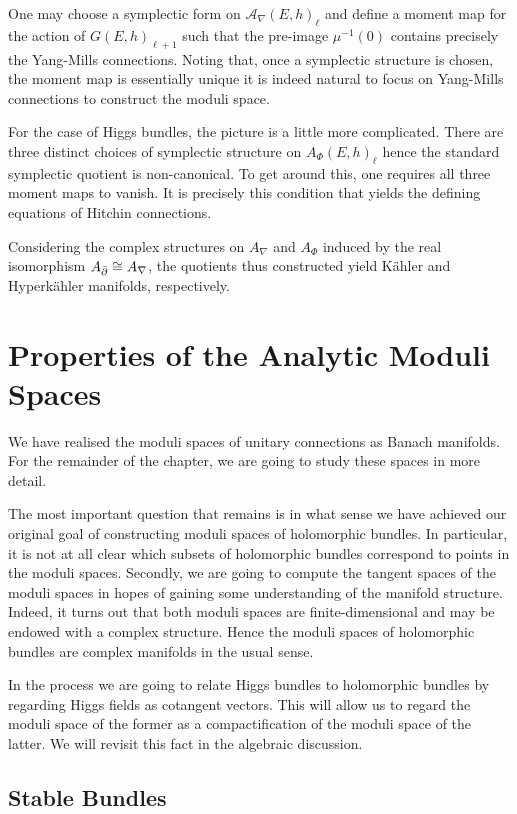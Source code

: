 \documentclass[12pt]{ociamthesis}  %
\begin{document}
One may choose a symplectic form on $\mathcal A_\nabla(E,h)_\ell$ and
define a moment map for the action of $G(E,h)_{\ell+1}$ such that the
pre-image $\mu^{-1}(0)$ contains precisely the Yang-Mills connections.
Noting that, once a symplectic structure is chosen, the moment map
is essentially unique it is indeed natural to focus on Yang-Mills
connections to construct the moduli space.

For the case of Higgs bundles, the picture is a little more complicated.
There are three distinct choices of symplectic structure on
$A_\Phi(E,h)_\ell$ hence the standard symplectic quotient is non-canonical.
To get around this, one requires all three moment maps to vanish. It is
precisely this condition that yields the defining equations of
Hitchin connections.

Considering the complex structures on $A_\nabla$ and $A_\Phi$ induced
by the real isomorphism $A_{\bar{\partial}}\cong A_\nabla$, the quotients
thus constructed yield K\"ahler and Hyperk\"ahler manifolds, respectively.

\section{Properties of the Analytic Moduli Spaces}

We have realised the moduli spaces of unitary connections as
Banach manifolds. For the remainder of the chapter, we are going to
study these spaces in more detail.

The most important question that remains is in what sense we have
achieved our original goal of constructing moduli spaces of
holomorphic bundles. In particular, it is not at all clear which subsets
of holomorphic bundles correspond to points in the moduli spaces.
Secondly, we are going to compute the tangent spaces of the moduli
spaces in hopes of gaining some understanding of the manifold structure.
Indeed, it turns out that both moduli spaces are finite-dimensional
and may be endowed with a complex structure. Hence the moduli spaces
of holomorphic bundles are complex manifolds in the usual sense.

In the process we are going to relate Higgs bundles to holomorphic bundles
by regarding Higgs fields as cotangent vectors. This will allow us to
regard the moduli space of the former as a compactification of the moduli
space of the latter. We will revisit this fact in the algebraic discussion.

\subsection{Stable Bundles}
\end{document}

